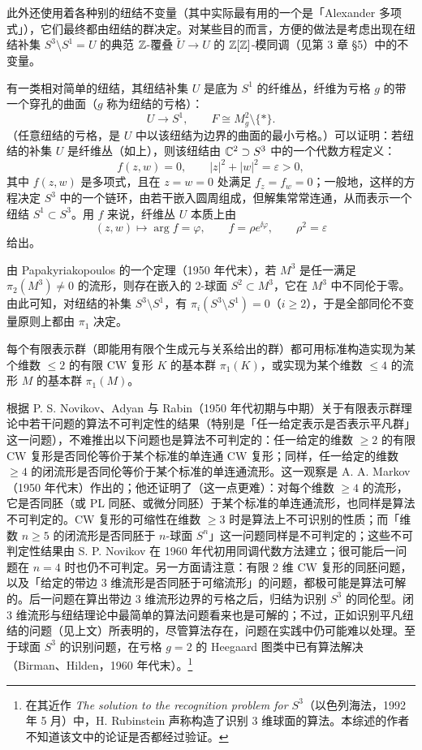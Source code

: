 此外还使用着各种别的纽结不变量（其中实际最有用的一个是「Alexander 多项式」），它们最终都由纽结的群决定。对某些目的而言，方便的做法是考虑出现在纽结补集 $S^{3}\setminus S^{1}=U$ 的典范 $\mathbb{Z}$-覆叠 $\tilde U\to U$ 的 $\mathbb{Z}[\mathbb{Z}]$-模同调（见第 3 章 §5）中的不变量。


有一类相对简单的纽结，其纽结补集 $U$ 是底为 $S^{1}$ 的纤维丛，纤维为亏格 $g$ 的带一个穿孔的曲面（$g$ 称为纽结的亏格）：
\[
U\to S^{1},\qquad F\cong M_{g}^{2}\setminus\{*\}.
\]
（任意纽结的亏格，是 $U$ 中以该纽结为边界的曲面的最小亏格。）可以证明：若纽结的补集 $U$ 是纤维丛（如上），则该纽结由 $\mathbb{C}^{2}\supset S^{3}$ 中的一个代数方程定义：
\[
f(z,w)=0,\qquad |z|^{2}+|w|^{2}=\varepsilon>0,
\]
其中 $f(z,w)$ 是多项式，且在 $z=w=0$ 处满足 $f_{z}=f_{w}=0$；一般地，这样的方程决定 $S^{3}$ 中的一个链环，由若干嵌入圆周组成，但解集常常连通，从而表示一个纽结 $S^{1}\subset S^{3}$。用 $f$ 来说，纤维丛 $U$ 本质上由
\[
(z,w)\mapsto\arg f=\varphi,\qquad f=\rho e^{\ii\varphi},\qquad \rho^{2}=\varepsilon
\]
给出。

由 Papakyriakopoulos 的一个定理（1950 年代末），若 $M^{3}$ 是任一满足 $\pi_{2}(M^{3})\neq 0$ 的流形，则存在嵌入的 2-球面 $S^{2}\subset M^{3}$，它在 $M^{3}$ 中不同伦于零。由此可知，对纽结的补集 $S^{3}\setminus S^{1}$，有 $\pi_{i}(S^{3}\setminus S^{1})=0$（$i\ge 2$），于是全部同伦不变量原则上都由 $\pi_{1}$ 决定。

每个有限表示群（即能用有限个生成元与关系给出的群）都可用标准构造实现为某个维数 $\le 2$ 的有限 CW 复形 $K$ 的基本群 $\pi_{1}(K)$，或实现为某个维数 $\le 4$ 的流形 $M$ 的基本群 $\pi_{1}(M)$。

根据 P. S. Novikov、Adyan 与 Rabin（1950 年代初期与中期）关于有限表示群理论中若干问题的算法不可判定性的结果（特别是「任一给定表示是否表示平凡群」这一问题），不难推出以下问题也是算法不可判定的：任一给定的维数 $\ge 2$ 的有限 CW 复形是否同伦等价于某个标准的单连通 CW 复形；同样，任一给定的维数 $\ge 4$ 的闭流形是否同伦等价于某个标准的单连通流形。这一观察是 A. A. Markov（1950 年代末）作出的；他还证明了（这一点更难）：对每个维数 $\ge 4$ 的流形，它是否同胚（或 PL 同胚、或微分同胚）于某个标准的单连通流形，也同样是算法不可判定的。CW 复形的可缩性在维数
$\ge 3$ 时是算法上不可识别的性质；而「维数 $n\ge 5$ 的闭流形是否同胚于 $n$-球面 $S^{n}$」这一问题同样是不可判定的；这些不可判定性结果由 S. P. Novikov 在 1960 年代初用同调代数方法建立；很可能后一问题在 $n=4$ 时也仍不可判定。另一方面请注意：有限 2 维 CW 复形的同胚问题，以及「给定的带边 3 维流形是否同胚于可缩流形」的问题，都极可能是算法可解的。后一问题在算出带边 3 维流形边界的亏格之后，归结为识别 $S^{3}$ 的同伦型。闭 3 维流形与纽结理论中最简单的算法问题看来也是可解的；不过，正如识别平凡纽结的问题（见上文）所表明的，尽管算法存在，问题在实践中仍可能难以处理。至于球面 $S^{3}$ 的识别问题，在亏格 $g=2$ 的 Heegaard 图类中已有算法解决（Birman、Hilden，1960 年代末）。\footnote{在其近作 \emph{The solution to the recognition problem for $S^{3}$}（以色列海法，1992 年 5 月）中，H. Rubinstein 声称构造了识别 3 维球面的算法。本综述的作者不知道该文中的论证是否都经过验证。}

